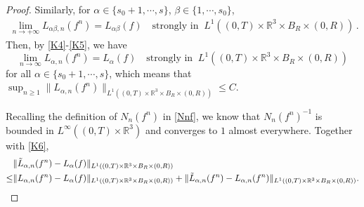 \documentclass[10pt,a4paper]{amsart}
\def\R{\mathbb{R}}
\begin{document}
\begin{proof}
Similarly, for $ \alpha \in \{ s_0 + 1, \cdots, s \} $, $\beta \in \{ 1, \cdots, s_0 \}$, 
\begin{equation}\label{K5}
  \begin{aligned}
    \lim_{n \to + \infty} L_{ \alpha \beta ,n} (f^n ) = L_{ \alpha \beta} (f) \quad \textrm{strongly in } \ L^1 ( (0, T) \times \R^3 \times B_R \times (0, R) ) \,.
  \end{aligned}
\end{equation}
Then, by \eqref{K4}-\eqref{K5}, we have
\begin{equation}\label{K6}
	\lim\limits_{n\rightarrow \infty } L_{\alpha ,n} (f^n) =L_{\alpha } (f) \quad \text{strongly in }\ L^1((0,T)\times \R^3 \times B_R\times (0,R))
\end{equation}
for all $\alpha \in \{s_0+1,\cdots,s\}$, which means that $ \sup_{n \geq 1} \| L_{\alpha ,n} (f^n) \|_{ L^1((0,T)\times \R^3 \times B_R\times (0,R)) } \leq C $. 

Recalling the definition of $N_n (f^n)$ in \eqref{Nnf}, we know that $N_n (f^n)^{-1}$ is bounded in $L^\infty ( (0,T) \times \R^3)$ and converges to $1$ almost everywhere. Together with \eqref{K6},
\begin{equation}\label{eq6.78}{\small
	\begin{aligned}
		& \Vert \tilde{L}_{\alpha ,n}(f^n) -L_\alpha (f) \Vert_{L^1((0,T)\times \R^3 \times B_R \times (0,R))} \\
		\leq & \Vert {L}_{\alpha ,n}(f^n) -L_\alpha (f) \Vert_{L^1((0,T)\times \R^3 \times B_R \times (0,R))} + \Vert \tilde{L}_{\alpha ,n}(f^n) - {L}_{\alpha ,n}(f^n) \Vert_{L^1((0,T)\times \R^3 \times B_R \times (0,R))}  .
	\end{aligned}}
\end{equation}



\end{proof}
\end{document}
